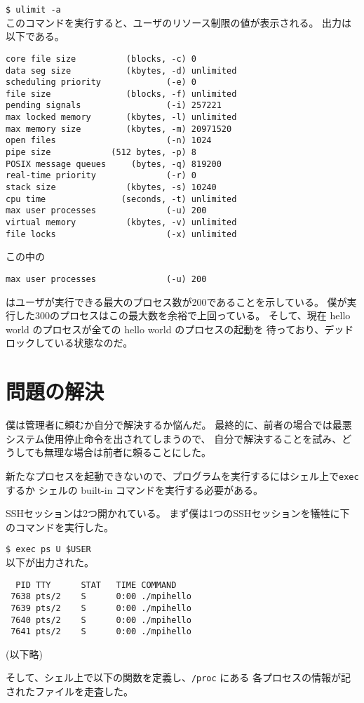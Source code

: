 \documentclass[a4j,10pt]{jarticle}
\begin{document}
\texttt{\$ ulimit -a} \\
このコマンドを実行すると、ユーザのリソース制限の値が表示される。
出力は以下である。
\begin{addmargin}[1.5em]{2em}
\begin{verbatim}
core file size          (blocks, -c) 0
data seg size           (kbytes, -d) unlimited
scheduling priority             (-e) 0
file size               (blocks, -f) unlimited
pending signals                 (-i) 257221
max locked memory       (kbytes, -l) unlimited
max memory size         (kbytes, -m) 20971520
open files                      (-n) 1024
pipe size            (512 bytes, -p) 8
POSIX message queues     (bytes, -q) 819200
real-time priority              (-r) 0
stack size              (kbytes, -s) 10240
cpu time               (seconds, -t) unlimited
max user processes              (-u) 200
virtual memory          (kbytes, -v) unlimited
file locks                      (-x) unlimited
\end{verbatim}
\end{addmargin}
この中の

\begin{addmargin}[1.5em]{2em}
\begin{verbatim}
max user processes              (-u) 200
\end{verbatim}
\end{addmargin}
\noindent
はユーザが実行できる最大のプロセス数が200であることを示している。
僕が実行した300のプロセスはこの最大数を余裕で上回っている。
そして、現在 hello world のプロセスが全ての hello world のプロセスの起動を
待っており、デッドロックしている状態なのだ。

\section{問題の解決}
僕は管理者に頼むか自分で解決するか悩んだ。
最終的に、前者の場合では最悪システム使用停止命令を出されてしまうので、
自分で解決することを試み、どうしても無理な場合は前者に頼ることにした。

新たなプロセスを起動できないので、プログラムを実行するにはシェル上で\texttt{exec}するか
シェルの built-in コマンドを実行する必要がある。

SSHセッションは2つ開かれている。
まず僕は1つのSSHセッションを犠牲に下のコマンドを実行した。

\texttt{\$ exec ps U \$USER} \\
以下が出力された。
\begin{addmargin}[1.5em]{2em}
\begin{verbatim}
  PID TTY      STAT   TIME COMMAND
 7638 pts/2    S      0:00 ./mpihello
 7639 pts/2    S      0:00 ./mpihello
 7640 pts/2    S      0:00 ./mpihello
 7641 pts/2    S      0:00 ./mpihello
\end{verbatim}
(以下略)
\end{addmargin}
\noindent
そして、シェル上で以下の関数を定義し、\texttt{/proc} にある
各プロセスの情報が記されたファイルを走査した。
\end{document}
